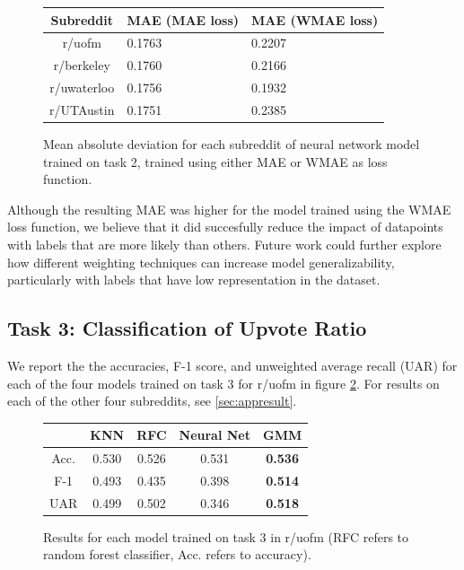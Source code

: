 \documentclass[11pt,a4paper]{article}
\let\Oldsubsection\subsection
\renewcommand{\subsection}{\FloatBarrier\Oldsubsection}
\begin{document}
    \begin{figure}
        \begin{center}
            \begin{tabular}{ |c|p{}|p{}|}
                \hline
                Subreddit & MAE (MAE loss) & MAE (WMAE loss) \\
                \hline
                r/uofm & 0.1763 & 0.2207 \\
                \hline
                r/berkeley & 0.1760 & 0.2166 \\
                \hline
                r/uwaterloo & 0.1756 & 0.1932 \\
                \hline
                r/UTAustin & 0.1751 & 0.2385 \\
                \hline
            \end{tabular}  
        \end{center}

        \caption{Mean absolute deviation for each subreddit of neural network model trained on task 2, trained using either MAE or WMAE as loss function.}
        \label{fig:task2res}
    \end{figure}

    Although the resulting MAE was higher for the model trained using the WMAE loss function, we believe that it did succesfully reduce the impact of datapoints with labels that are more likely than others. Future work could further explore how different weighting techniques can increase model generalizability, particularly with labels that have low representation in the dataset.

    \Oldsubsection{Task 3: Classification of Upvote Ratio}
    We report the the accuracies, F-1 score, and unweighted average recall (UAR) for each of the four models trained on task 3 for r/uofm in figure \ref{fig:task3res}. For results on each of the other four subreddits, see \ref{sec:appresult}.

    \begin{figure}
        \begin{center}
            \begin{tabular}{ |c|c|c|c|c| }
                \hline
                 & KNN & RFC & Neural Net & GMM \\
                \hline
                Acc. & 0.530 & 0.526 & 0.531 & \textbf{0.536} \\
                \hline
                F-1 & 0.493 & 0.435 & 0.398 & \textbf{0.514} \\
                \hline
                UAR & 0.499 & 0.502 & 0.346 & \textbf{0.518} \\
                \hline
            \end{tabular}  
        \end{center}

        \caption{Results for each model trained on task 3 in r/uofm (RFC refers to random forest classifier, Acc. refers to accuracy).}
        \label{fig:task3res}
    \end{figure}
\end{document}
